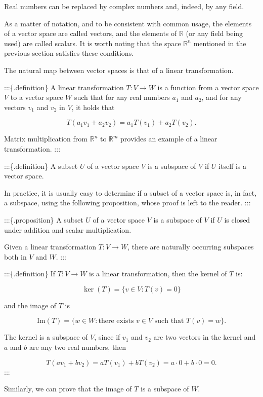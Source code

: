\documentclass[
]{book}
\theoremstyle{definition}
\theoremstyle{definition}
\theoremstyle{definition}
\theoremstyle{definition}
\theoremstyle{remark}
\begin{document}
Real numbers can be replaced by complex numbers and, indeed, by any field.

As a matter of notation, and to be consistent with common usage, the elements of a vector space are called vectors, and the elements of \(\mathbb{R}\) (or any field being used) are called scalars. It is worth noting that the space \(\mathbb{R}^n\) mentioned in the previous section satisfies these conditions.

The natural map between vector spaces is that of a linear transformation.

:::\{.definition\} A linear transformation \(T : V \to W\) is a function from a vector space \(V\) to a vector space \(W\) such that for any real numbers \(a_1\) and \(a_2\), and for any vectors \(v_1\) and \(v_2\) in \(V\), it holds that

\[
T(a_1 v_1 + a_2 v_2) = a_1 T(v_1) + a_2 T(v_2).
\]

Matrix multiplication from \(\mathbb{R}^n\) to \(\mathbb{R}^m\) provides an example of a linear transformation.
:::

:::\{.definition\} A subset \(U\) of a vector space \(V\) is a subspace of \(V\) if \(U\) itself is a vector space.

In practice, it is usually easy to determine if a subset of a vector space is, in fact, a subspace, using the following proposition, whose proof is left to the reader.
:::

:::\{.proposition\} A subset \(U\) of a vector space \(V\) is a subspace of \(V\) if \(U\) is closed under addition and scalar multiplication.

Given a linear transformation \(T : V \to W\), there are naturally occurring subspaces both in \(V\) and \(W\).
:::

:::\{.definition\} If \(T : V \to W\) is a linear transformation, then the kernel of \(T\) is:

\[
\ker(T) = \{ v \in V : T(v) = 0 \}
\]

and the image of \(T\) is

\[
\text{Im}(T) = \{ w \in W : \text{there exists } v \in V \text{ such that } T(v) = w \}.
\]

The kernel is a subspace of \(V\), since if \(v_1\) and \(v_2\) are two vectors in the kernel and \(a\) and \(b\) are any two real numbers, then

\[
T(a v_1 + b v_2) = a T(v_1) + b T(v_2) = a \cdot 0 + b \cdot 0 = 0.
\]
:::

Similarly, we can prove that the image of \(T\) is a subspace of \(W\).
\end{document}
